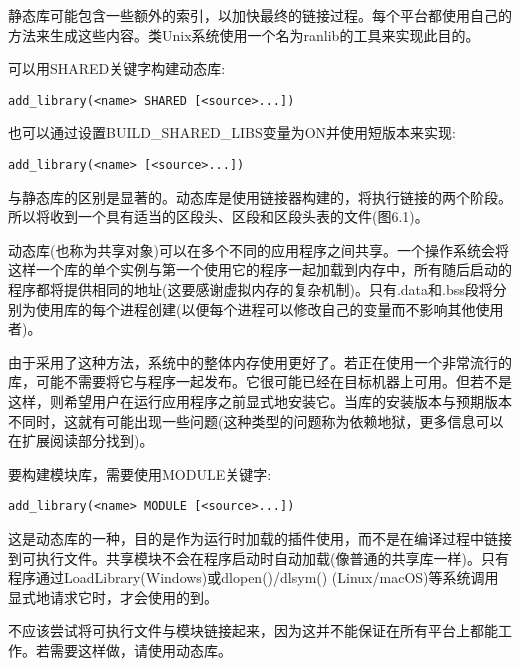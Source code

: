 静态库可能包含一些额外的索引，以加快最终的链接过程。每个平台都使用自己的方法来生成这些内容。类Unix系统使用一个名为ranlib的工具来实现此目的。


可以用SHARED关键字构建动态库:

\begin{lstlisting}[style=styleCMake]
add_library(<name> SHARED [<source>...])
\end{lstlisting}

也可以通过设置BUILD\_SHARED\_LIBS变量为ON并使用短版本来实现:

\begin{lstlisting}[style=styleCMake]
add_library(<name> [<source>...])
\end{lstlisting}

与静态库的区别是显著的。动态库是使用链接器构建的，将执行链接的两个阶段。所以将收到一个具有适当的区段头、区段和区段头表的文件(图6.1)。

动态库(也称为共享对象)可以在多个不同的应用程序之间共享。一个操作系统会将这样一个库的单个实例与第一个使用它的程序一起加载到内存中，所有随后启动的程序都将提供相同的地址(这要感谢虚拟内存的复杂机制)。只有.data和.bss段将分别为使用库的每个进程创建(以便每个进程可以修改自己的变量而不影响其他使用者)。

由于采用了这种方法，系统中的整体内存使用更好了。若正在使用一个非常流行的库，可能不需要将它与程序一起发布。它很可能已经在目标机器上可用。但若不是这样，则希望用户在运行应用程序之前显式地安装它。当库的安装版本与预期版本不同时，这就有可能出现一些问题(这种类型的问题称为依赖地狱，更多信息可以在扩展阅读部分找到)。


要构建模块库，需要使用MODULE关键字:

\begin{lstlisting}[style=styleCMake]
add_library(<name> MODULE [<source>...])
\end{lstlisting}

这是动态库的一种，目的是作为运行时加载的插件使用，而不是在编译过程中链接到可执行文件。共享模块不会在程序启动时自动加载(像普通的共享库一样)。只有程序通过LoadLibrary(Windows)或dlopen()/dlsym() (Linux/macOS)等系统调用显式地请求它时，才会使用的到。

不应该尝试将可执行文件与模块链接起来，因为这并不能保证在所有平台上都能工作。若需要这样做，请使用动态库。


